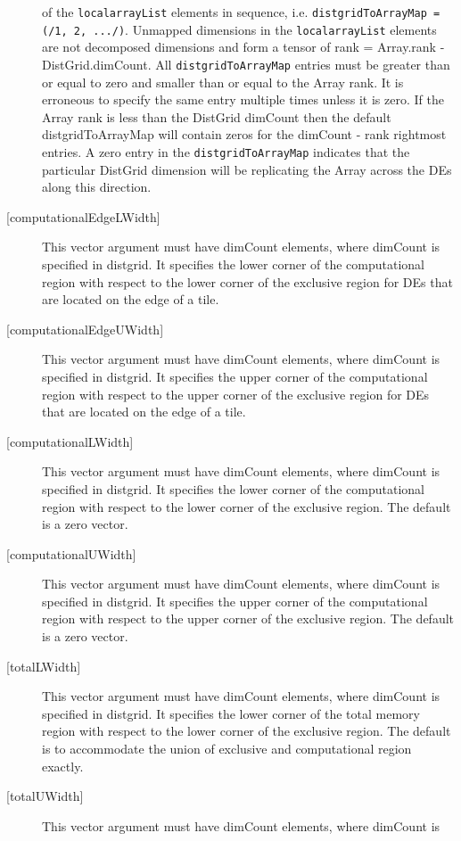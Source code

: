 \begin{description}
   of the {\tt localarrayList} elements in sequence, i.e.
   {\tt distgridToArrayMap = (/1, 2, .../)}.
   Unmapped dimensions in the {\tt localarrayList} elements are not
   decomposed dimensions and form a tensor of
   rank = Array.rank - DistGrid.dimCount.
   All {\tt distgridToArrayMap} entries must be greater than or equal
   to zero and smaller than or equal to the Array rank. It is erroneous
   to specify the same entry multiple times unless it is zero.
   If the Array rank is less than the DistGrid dimCount then the default
   distgridToArrayMap will contain zeros for the dimCount - rank
   rightmost entries. A zero entry in the {\tt distgridToArrayMap}
   indicates that the particular DistGrid dimension will be replicating
   the Array across the DEs along this direction.
   \item[{[computationalEdgeLWidth]}]
   This vector argument must have dimCount elements, where dimCount is
   specified in distgrid. It specifies the lower corner of the computational
   region with respect to the lower corner of the exclusive region for DEs
   that are located on the edge of a tile.
   \item[{[computationalEdgeUWidth]}]
   This vector argument must have dimCount elements, where dimCount is
   specified in distgrid. It specifies the upper corner of the computational
   region with respect to the upper corner of the exclusive region for DEs
   that are located on the edge of a tile.
   \item[{[computationalLWidth]}]
   This vector argument must have dimCount elements, where dimCount is
   specified in distgrid. It specifies the lower corner of the computational
   region with respect to the lower corner of the exclusive region.
   The default is a zero vector.
   \item[{[computationalUWidth]}]
   This vector argument must have dimCount elements, where dimCount is
   specified in distgrid. It specifies the upper corner of the computational
   region with respect to the upper corner of the exclusive region.
   The default is a zero vector.
   \item[{[totalLWidth]}]
   This vector argument must have dimCount elements, where dimCount is
   specified in distgrid. It specifies the lower corner of the total memory
   region with respect to the lower corner of the exclusive region.
   The default is to accommodate the union of exclusive and computational
   region exactly.
   \item[{[totalUWidth]}]
   This vector argument must have dimCount elements, where dimCount is

\end{description}
